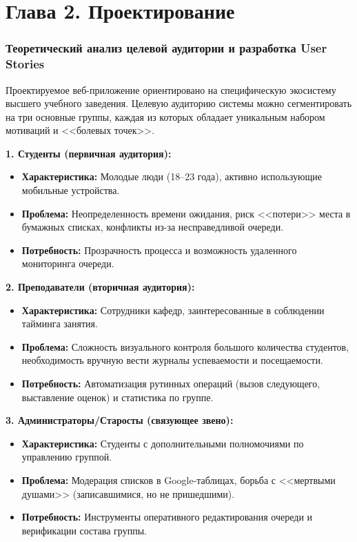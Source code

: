 \section*{Глава 2. Проектирование}

\setcounter{section}{2}  
\setcounter{subsection}{1} 
\setcounter{subsubsection}{0} 

\subsubsection{Теоретический анализ целевой аудитории и разработка User Stories}

Проектируемое веб-приложение ориентировано на специфическую экосистему высшего учебного заведения. 
Целевую аудиторию системы можно сегментировать на три основные группы, каждая из которых обладает
 уникальным набором мотиваций и <<болевых точек>>.

\textbf{1. Студенты (первичная аудитория):}
\begin{itemize}
    \item \textbf{Характеристика:} Молодые люди (18–23 года), активно использующие мобильные устройства.
    \item \textbf{Проблема:} Неопределенность времени ожидания, риск <<потери>> места в бумажных списках, 
 конфликты из-за несправедливой очереди.
    \item \textbf{Потребность:} Прозрачность процесса и возможность удаленного мониторинга очереди.
\end{itemize}

\textbf{2. Преподаватели (вторичная аудитория):}
\begin{itemize}
    \item \textbf{Характеристика:} Сотрудники кафедр, заинтересованные в соблюдении тайминга занятия.
    \item \textbf{Проблема:} Сложность визуального контроля большого количества студентов, необходимость 
 вручную вести журналы успеваемости и посещаемости.
    \item \textbf{Потребность:} Автоматизация рутинных операций (вызов следующего, выставление оценок) и 
 статистика по группе.
\end{itemize}

\textbf{3. Администраторы/Старосты (связующее звено):}
\begin{itemize}
    \item \textbf{Характеристика:} Студенты с дополнительными полномочиями по управлению группой.
    \item \textbf{Проблема:} Модерация списков в Google-таблицах, борьба с <<мертвыми душами>> 
 (записавшимися, но не пришедшими).
    \item \textbf{Потребность:} Инструменты оперативного редактирования очереди и верификации состава группы.
\end{itemize}

